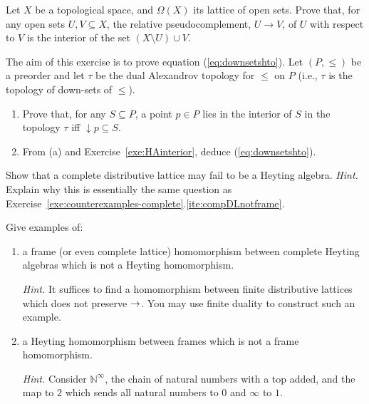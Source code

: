 \begin{exercise}\label{exe:HAinterior}
Let $X$ be a topological space, and $\Omega(X)$ its lattice of open sets. Prove that, for any open sets $U, V \subseteq X$, the relative pseudocomplement, $U \to V$, of $U$ with respect to $V$ is the interior of the set $(X \setminus U) \cup V$.
\end{exercise}

\begin{exercise}\label{exe:downsetsHA}
The aim of this exercise is to prove equation (\ref{eq:downsetshto}). Let $(P, \leq)$ be a preorder and let $\tau$ be the dual Alexandrov topology for $\leq$ on $P$ (i.e., $\tau$ is the topology of down-sets of $\leq$).
\begin{enumerate}
\item Prove that, for any $S \subseteq P$, a point $p \in P$ lies in the interior of $S$ in the topology $\tau$ iff ${\downarrow} p \subseteq S$.
\item From (a) and Exercise~\ref{exe:HAinterior}, deduce (\ref{eq:downsetshto}).
\end{enumerate}
\end{exercise}

\begin{exercise}\label{exe:non-HA}
  Show that a complete distributive lattice may fail to be a Heyting algebra.
  {\it Hint.} Explain why this is essentially the same question as Exercise~\ref{exe:counterexamples-complete}.\ref{ite:compDLnotframe}.
\end{exercise}

\begin{exercise}\label{exe:morphismsHAdifferent}
Give examples of:
\begin{enumerate}
\item a frame (or even complete lattice) homomorphism between complete Heyting algebras which is not a Heyting homomorphism.

{\it Hint.} It suffices to find a homomorphism between finite distributive lattices which does not preserve $\to$. You may use finite duality to construct such an example.

\item a Heyting homomorphism between frames which is not a frame homomorphism. 

{\it Hint.} Consider $\mathbb N^\infty$, the chain of natural numbers with a top added, and the map to $2$ which sends all natural numbers to $0$ and $\infty$ to $1$.
\end{enumerate}
\end{exercise}


